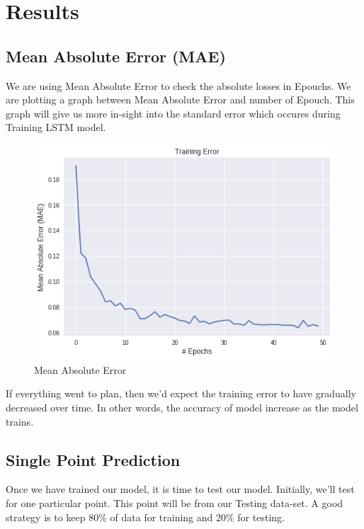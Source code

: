 \chapter{Results}

\section{Mean Absolute Error (MAE)}
We are using Mean Absolute Error to check the absolute losses in Epouchs. We are plotting a graph between Mean Absolute Error and number of Epouch. This graph will give us more in-sight into the standard error which occures during Training LSTM model.

\begin{figure}[h]
    \centering \includegraphics[scale=0.5]{images/mae.png}
    \caption{Mean Absolute Error}
\end{figure}

If everything went to plan, then we'd expect the training error to have gradually decreased over time. In other words, the accuracy of model increase as the model trains.


\section{Single Point Prediction}
Once we have trained our model, it is time to test our model. Initially, we'll test for one particular point. This point will be from our Testing data-set. A good strategy is to keep 80\% of data for training and 20\% for testing.

